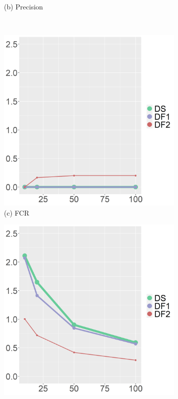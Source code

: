 \begin{figure}[ht!]
\begin{subfigure}[b]{.32\columnwidth}
    \caption{(b) Precision}
    \label{fig:precision}
\end{subfigure}
\\
\centering
\begin{subfigure}[b]{.32\columnwidth} 
    \includegraphics[width=\columnwidth]{../../plot/FCR_1.png}
    \caption{(c) FCR}
    \label{fig:fcr}
\end{subfigure}
\hfill
\centering
\begin{subfigure}[b]{.32\columnwidth} 
    \includegraphics[width=\columnwidth]{../../plot/len_1.png}

\end{subfigure}
\end{figure}
